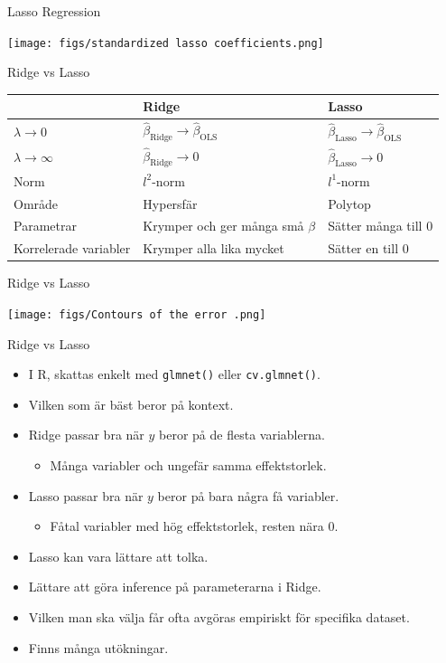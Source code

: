 \documentclass[10pt,english]{beamer}
\begin{document}
\begin{frame}{Lasso Regression}
    
    \texttt{[image: figs/standardized lasso coefficients.png]}

\end{frame}

\begin{frame}{Ridge vs Lasso}
    \begin{tabular}{lll}
        & Ridge & Lasso \\ \hline
        $\lambda \to 0$ & $\hat{\beta}_{\text{Ridge}} \to \hat{\beta}_{\text{OLS}}$ & $\hat{\beta}_{\text{Lasso}} \to \hat{\beta}_{\text{OLS}}$ \\
        $\lambda \to \infty$ &  $\hat{\beta}_{\text{Ridge}} \to 0$ &  $\hat{\beta}_{\text{Lasso}} \to 0$ \\
        Norm & $l^2$-norm & $l^1$-norm \\
        Område & Hypersfär & Polytop \\
        Parametrar & Krymper och ger många små $\beta$ & Sätter många till 0 \\
        Korrelerade variabler & Krymper alla lika mycket & Sätter en till 0
    \end{tabular}
\end{frame}

\begin{frame}{Ridge vs Lasso}

    \texttt{[image: figs/Contours of the error .png]}
    
\end{frame}

\begin{frame}{Ridge vs Lasso}
    
    \begin{itemize}
        \item I R, skattas enkelt med \texttt{glmnet()} eller \texttt{cv.glmnet()}.
        \item Vilken som är bäst beror på kontext.
        \item Ridge passar bra när $y$ beror på de flesta variablerna.
        \begin{itemize}
            \item Många variabler och ungefär samma effektstorlek.
        \end{itemize}
        \item Lasso passar bra när $y$ beror på bara några få variabler.
        \begin{itemize}
            \item Fåtal variabler med hög effektstorlek, resten nära 0.
        \end{itemize}
        \item Lasso kan vara lättare att tolka.
        \item Lättare att göra inference på parameterarna i Ridge.
        \item Vilken man ska välja får ofta avgöras empiriskt för specifika dataset.
        \item Finns många utökningar.
    \end{itemize}

\end{frame}
\end{document}
